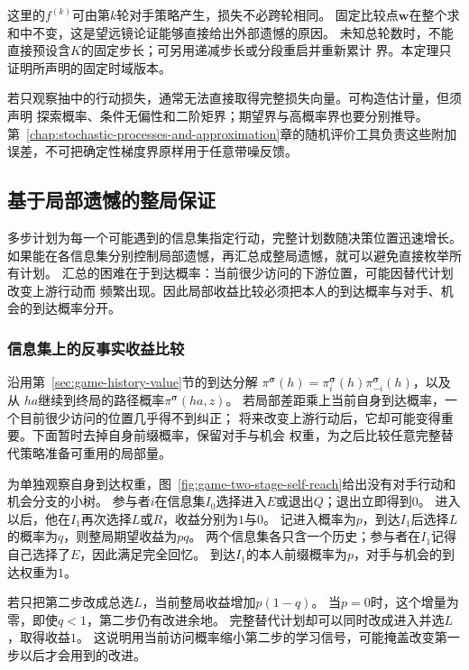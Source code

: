 这里的\(f^{(k)}\)可由第\(k\)轮对手策略产生，损失不必跨轮相同。
固定比较点\(\bm w\)在整个求和中不变，这是望远镜论证能够直接给出外部遗憾的原因。
未知总轮数时，不能直接预设含\(K\)的固定步长；可另用递减步长或分段重启并重新累计
界。本定理只证明所声明的固定时域版本。

若只观察抽中的行动损失，通常无法直接取得完整损失向量。可构造估计量，但须声明
探索概率、条件无偏性和二阶矩界；期望界与高概率界也要分别推导。
第~\ref{chap:stochastic-processes-and-approximation}章的随机评价工具负责这些附加
误差，不可把确定性梯度界原样用于任意带噪反馈。

\subsection{基于局部遗憾的整局保证}
\label{sec:game-local-to-global-regret}

多步计划为每一个可能遇到的信息集指定行动，完整计划数随决策位置迅速增长。
如果能在各信息集分别控制局部遗憾，再汇总成整局遗憾，就可以避免直接枚举所有计划。
汇总的困难在于到达概率：当前很少访问的下游位置，可能因替代计划改变上游行动而
频繁出现。因此局部收益比较必须把本人的到达概率与对手、机会的到达概率分开。

\subsubsection{信息集上的反事实收益比较}
\label{sec:game-counterfactual-comparison}

沿用第~\ref{sec:game-history-value}节的到达分解
\(\pi^{\bm\sigma}(h)=\pi_i^{\bm\sigma}(h)\pi_{-i}^{\bm\sigma}(h)\)，以及从
\(ha\)继续到终局的路径概率\(\pi^{\bm\sigma}(ha,z)\)。
若局部差距乘上当前自身到达概率，一个目前很少访问的位置几乎得不到纠正；
将来改变上游行动后，它却可能变得重要。下面暂时去掉自身前缀概率，保留对手与机会
权重，为之后比较任意完整替代策略准备可重用的局部量。

\begin{example}[同一参与者的两层决策]
\label{ex:game-two-stage-self-reach}
为单独观察自身到达权重，图~\ref{fig:game-two-stage-self-reach}给出没有对手行动和机会分支的小树。
参与者$i$在信息集$I_0$选择进入$E$或退出$Q$；退出立即得到$0$。
进入以后，他在$I_1$再次选择$L$或$R$，收益分别为$1$与$0$。
记进入概率为$p$，到达$I_1$后选择$L$的概率为$q$，则整局期望收益为$pq$。
两个信息集各只含一个历史；参与者在$I_1$记得自己选择了$E$，因此满足完全回忆。
到达$I_1$的本人前缀概率为$p$，对手与机会的到达权重为$1$。

若只把第二步改成总选$L$，当前整局收益增加$p(1-q)$。
当$p=0$时，这个增量为零，即使$q<1$，第二步仍有改进余地。
完整替代计划却可以同时改成进入并选$L$，取得收益$1$。
这说明用当前访问概率缩小第二步的学习信号，可能掩盖改变第一步以后才会用到的改进。
\end{example}

